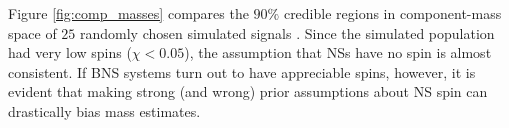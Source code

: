 Figure \ref{fig:comp_masses} compares the $90\%$ credible regions in component-mass space of $25$ randomly chosen simulated signals \citep[cf.][figure 1]{Chatziioannou_2014}.  Since the simulated population had very low spins ($\chi < 0.05$), the assumption that NSs have no spin is almost consistent.  If BNS systems turn out to have appreciable spins, however, it is evident that making strong (and wrong) prior assumptions about NS spin can drastically bias mass estimates.